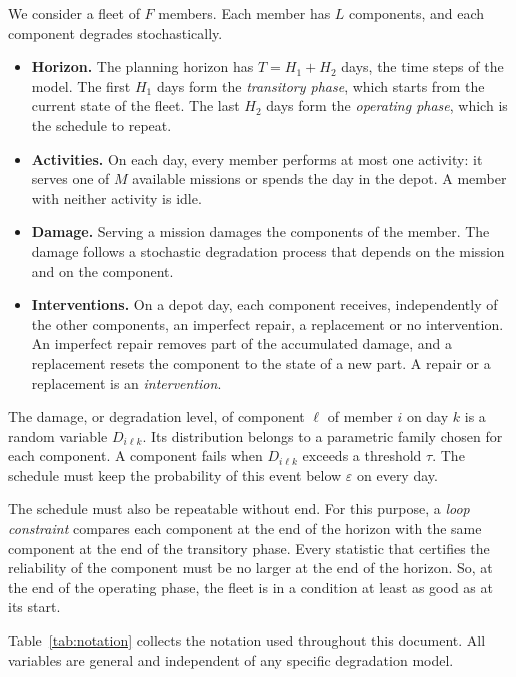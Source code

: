 \documentclass[11pt,a4paper]{article}
\theoremstyle{plain}
\theoremstyle{definition}
\theoremstyle{remark}
\begin{document}
We consider a fleet of $F$ members.
Each member has $L$ components, and each component degrades stochastically.
\begin{itemize}
  \item \textbf{Horizon.} The planning horizon has $T = H_1 + H_2$ days, the time steps of the model.
    The first $H_1$ days form the \emph{transitory phase}, which starts from the current state of the fleet.
    The last $H_2$ days form the \emph{operating phase}, which is the schedule to repeat.
  \item \textbf{Activities.} On each day, every member performs at most one activity: it serves one of $M$ available missions or spends the day in the depot.
    A member with neither activity is idle.
  \item \textbf{Damage.} Serving a mission damages the components of the member.
    The damage follows a stochastic degradation process that depends on the mission and on the component.
  \item \textbf{Interventions.} On a depot day, each component receives, independently of the other components, an imperfect repair, a replacement or no intervention.
    An imperfect repair removes part of the accumulated damage, and a replacement resets the component to the state of a new part.
    A repair or a replacement is an \emph{intervention}.
\end{itemize}

The damage, or degradation level, of component $\ell$ of member $i$ on day $k$ is a random variable $D_{i\ell k}$.
Its distribution belongs to a parametric family chosen for each component.
A component fails when $D_{i\ell k}$ exceeds a threshold $\tau$.
The schedule must keep the probability of this event below $\varepsilon$ on every day.

The schedule must also be repeatable without end.
For this purpose, a \emph{loop constraint} compares each component at the end of the horizon with the same component at the end of the transitory phase.
Every statistic that certifies the reliability of the component must be no larger at the end of the horizon.
So, at the end of the operating phase, the fleet is in a condition at least as good as at its start.

Table~\ref{tab:notation} collects the notation used throughout this document.
All variables are general and independent of any specific degradation model.
\end{document}
